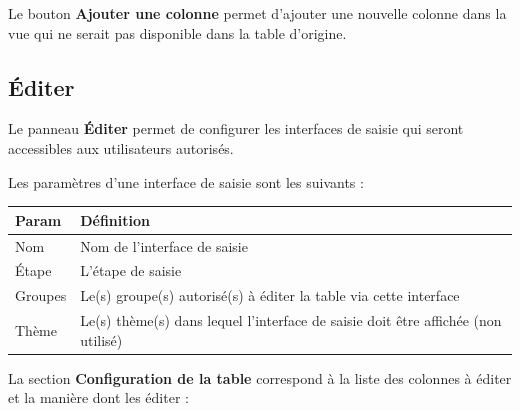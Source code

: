 \documentclass[letterpaper,10pt,french]{sphinxmanual}
\begin{document}
Le bouton \textbf{Ajouter une colonne} permet d'ajouter une nouvelle
colonne dans la vue qui ne serait pas disponible dans la table
d'origine.


\subsection{Éditer}
\label{tables/infopanel:editer}
Le panneau \textbf{Éditer} permet de configurer les interfaces de saisie
qui seront accessibles aux utilisateurs autorisés.


Les paramètres d'une interface de saisie sont les suivants :

\begin{tabulary}{\linewidth}{|L|L|}
\hline

\textbf{Param}
 & 
\textbf{Définition}
\\
\hline
Nom
 & 
Nom de l'interface de saisie
\\
\hline
Étape
 & 
L'étape de saisie
\\
\hline
Groupes
 & 
Le(s) groupe(s) autorisé(s) à éditer la table via cette interface
\\
\hline
Thème
 & 
Le(s) thème(s) dans lequel l'interface de saisie doit être affichée (non utilisé)
\\
\hline\end{tabulary}


La section \textbf{Configuration de la table} correspond à la liste des
colonnes à éditer et la manière dont les éditer :
\end{document}
